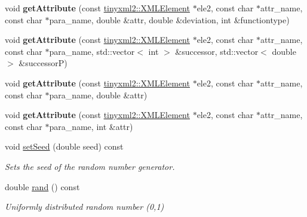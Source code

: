 \begin{DoxyCompactItemize}
void {\bfseries get\+Attribute} (const \hyperlink{classCPlantBox_1_1tinyxml2_1_1XMLElement}{tinyxml2\+::\+X\+M\+L\+Element} $\ast$ele2, const char $\ast$attr\+\_\+name, const char $\ast$para\+\_\+name, double \&attr, double \&deviation, int \&functiontype)
\item 
\mbox{\label{classCPlantBox_1_1OrganRandomOrganParameter_aa0d2c68d49367b4389942b55c3518afd}} 
void {\bfseries get\+Attribute} (const \hyperlink{classCPlantBox_1_1tinyxml2_1_1XMLElement}{tinyxml2\+::\+X\+M\+L\+Element} $\ast$ele2, const char $\ast$attr\+\_\+name, const char $\ast$para\+\_\+name, std\+::vector$<$ int $>$ \&successor, std\+::vector$<$ double $>$ \&successorP)
\item 
\mbox{\label{classCPlantBox_1_1OrganRandomOrganParameter_aa34c93906eecb2fc67457720cb52d334}} 
void {\bfseries get\+Attribute} (const \hyperlink{classCPlantBox_1_1tinyxml2_1_1XMLElement}{tinyxml2\+::\+X\+M\+L\+Element} $\ast$ele2, const char $\ast$attr\+\_\+name, const char $\ast$para\+\_\+name, double \&attr)
\item 
\mbox{\label{classCPlantBox_1_1OrganRandomOrganParameter_aabfc0756cab376654621f8f49542c4f3}} 
void {\bfseries get\+Attribute} (const \hyperlink{classCPlantBox_1_1tinyxml2_1_1XMLElement}{tinyxml2\+::\+X\+M\+L\+Element} $\ast$ele2, const char $\ast$attr\+\_\+name, const char $\ast$para\+\_\+name, int \&attr)
\item 
\mbox{\label{classCPlantBox_1_1OrganRandomOrganParameter_a45f507c8e6bad457984a2e52c157e00b}} 
void \hyperlink{classCPlantBox_1_1OrganRandomOrganParameter_a45f507c8e6bad457984a2e52c157e00b}{set\+Seed} (double seed) const
\begin{DoxyCompactList}\small\item\em Sets the seed of the random number generator. \end{DoxyCompactList}\item 
\mbox{\label{classCPlantBox_1_1OrganRandomOrganParameter_a786d284ce6233ac93b1ea878ed048024}} 
double \hyperlink{classCPlantBox_1_1OrganRandomOrganParameter_a786d284ce6233ac93b1ea878ed048024}{rand} () const
\begin{DoxyCompactList}\small\item\em Uniformly distributed random number (0,1) \end{DoxyCompactList}\item 

\end{DoxyCompactItemize}
